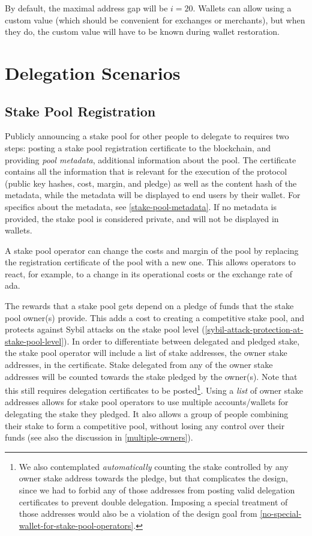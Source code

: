 \documentclass[11pt,a4paper,dvipsnames,twosided]{article}
\begin{document}
By default, the maximal address gap will be \(i=20\). Wallets can
allow using a custom value (which should be convenient for exchanges
or merchants), but when they do, the custom value will have to be
known during wallet restoration.

\section{Delegation Scenarios}
\label{delegation-scenarios}

\subsection{Stake Pool Registration}
\label{stake-pool-registration}

Publicly announcing a stake pool for other people to delegate to requires two
steps: posting a stake pool registration certificate to the blockchain, and
providing \emph{pool metadata}, additional information about the pool. The
certificate contains all the information that is relevant for the execution of
the protocol (public key hashes, cost, margin, and pledge) as well as the
content hash of the metadata, while the metadata will be displayed to end users
by their wallet. For specifics about the metadata, see
\cref{stake-pool-metadata}. If no metadata is provided, the stake pool is
considered private, and will not be displayed in wallets.

A stake pool operator can change the costs and margin of the pool by
replacing the registration certificate of the pool with a new
one. This allows operators to react, for example, to a change in its
operational costs or the exchange rate of ada.

The rewards that a stake pool gets depend on a pledge of funds that
the stake pool owner(s) provide. This adds a cost to creating a
competitive stake pool, and protects against Sybil attacks on the
stake pool level
(\cref{sybil-attack-protection-at-stake-pool-level}). In order to
differentiate between delegated and pledged stake, the stake pool
operator will include a list of stake addresses, the owner stake addresses,
in the certificate. Stake delegated from any of the owner stake addresses will be
counted towards the stake pledged by the owner(s). Note that this
still requires delegation certificates to be posted\footnote{We also
  contemplated \emph{automatically} counting the stake controlled by
  any owner stake address
  towards the pledge, but that complicates the design, since we had
  to forbid any of those addresses from posting valid delegation
  certificates to prevent double delegation. Imposing a special
  treatment of those addresses would also be a violation of the design goal
  from \cref{no-special-wallet-for-stake-pool-operators}.}.
Using a \emph{list} of owner stake addresses allows for stake pool operators
to use multiple accounts/wallets for delegating the stake they
pledged. It also allows a group of people combining their stake to
form a competitive pool, without losing any control over their funds
(see also the discussion in \cref{multiple-owners}).
\end{document}
